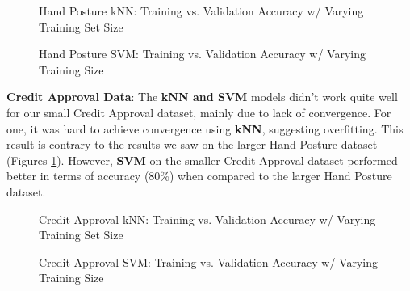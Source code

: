 \documentclass[letterpaper,12pt]{article}
\begin{document}
\begin{figure} %
  \centering
  \hspace{8pt}%
  \caption{Hand Posture kNN:  Training vs. Validation Accuracy w/ Varying Training Set Size}\label{fig:kNN Learning Curves}
\end{figure}

\begin{figure} %
  
  \centering
  \hspace{8pt}%
  \caption{Hand Posture SVM:  Training vs. Validation Accuracy w/ Varying Training Size}\label{fig:SVM Learning Curves}
\end{figure}

\textbf{Credit Approval Data}:
The \textbf{kNN and SVM} models didn't work quite well for our small Credit Approval dataset, mainly due to lack of convergence.  For one, it was hard to achieve convergence using \textbf{kNN}, suggesting overfitting.  This result is contrary to the results we saw on the larger Hand Posture dataset (Figures \ref{fig:kNN Learning Curves}). However, \textbf{SVM} on the smaller Credit Approval dataset performed better in terms of accuracy (80\%) when compared to the larger Hand Posture dataset. 

\begin{figure} %
  \centering
  \hspace{8pt}%
  \caption{Credit Approval kNN:  Training vs. Validation Accuracy w/ Varying Training Set Size}\label{fig:CC kNN Learning Curves}
\end{figure}

\begin{figure} %
  \centering
  \hspace{8pt}%
  \caption{Credit Approval SVM:  Training vs. Validation Accuracy w/ Varying Training Size}\label{fig:SVM Learning Curves}
\end{figure}
\end{document}
